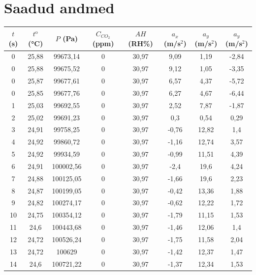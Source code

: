 \section{Saadud andmed}

\begin{table}[H]
    \centering
    \begin{tabular}{|c|c|c|c|c|c|c|c|}
    \hline
        $t$ (s) & $t^\text{o}$ (°C) & $P$ (Pa) & $C_{\si{CO_2}}$ (ppm) & $AH$ (RH\%) & $a_x$ (m/s$^2$) & $a_y$ (m/s$^2$) & $a_y$ (m/s$^2$) \\ \hline
        0 & 25,88 & 99673,14 & 0 & 30,97 & 9,09 & 1,19 & -2,84 \\ \hline
        0 & 25,88 & 99675,52 & 0 & 30,97 & 9,12 & 1,05 & -3,35 \\ \hline
        0 & 25,87 & 99677,61 & 0 & 30,97 & 6,57 & 4,37 & -5,72 \\ \hline
        0 & 25,85 & 99677,76 & 0 & 30,97 & 6,27 & 4,67 & -6,44 \\ \hline
        1 & 25,03 & 99692,55 & 0 & 30,97 & 2,52 & 7,87 & -1,87 \\ \hline
        2 & 25,02 & 99691,23 & 0 & 30,97 & 0,3 & 0,54 & 0,29 \\ \hline
        3 & 24,91 & 99758,25 & 0 & 30,97 & -0,76 & 12,82 & 1,4 \\ \hline
        4 & 24,92 & 99860,72 & 0 & 30,97 & -1,16 & 12,74 & 3,57 \\ \hline
        5 & 24,92 & 99934,59 & 0 & 30,97 & -0,99 & 11,51 & 4,39 \\ \hline
        6 & 24,91 & 100002,56 & 0 & 30,97 & -2,4 & 19,6 & 4,24 \\ \hline
        7 & 24,88 & 100125,05 & 0 & 30,97 & -1,66 & 19,6 & 2,23 \\ \hline
        8 & 24,87 & 100199,05 & 0 & 30,97 & -0,42 & 13,36 & 1,88 \\ \hline
        9 & 24,82 & 100274,17 & 0 & 30,97 & -0,62 & 12,22 & 1,72 \\ \hline
        10 & 24,75 & 100354,12 & 0 & 30,97 & -1,79 & 11,15 & 1,53 \\ \hline
        11 & 24,6 & 100443,68 & 0 & 30,97 & -1,46 & 12,06 & 1,4 \\ \hline
        12 & 24,72 & 100526,24 & 0 & 30,97 & -1,75 & 11,58 & 2,04 \\ \hline
        13 & 24,72 & 100629 & 0 & 30,97 & -1,42 & 12,37 & 1,47 \\ \hline
        14 & 24,6 & 100721,22 & 0 & 30,97 & -1,37 & 12,34 & 1,53 \\ \hline

\end{tabular}
\end{table}
